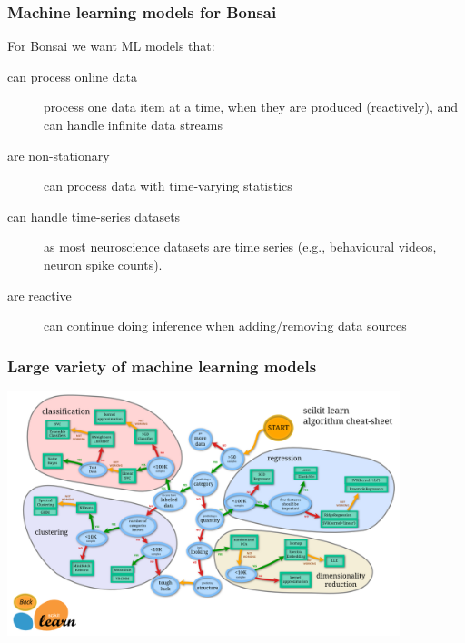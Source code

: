 \begin{frame}
    \frametitle{Machine learning models for Bonsai}

    For Bonsai we want ML models that:

    \begin{description}

        \item[can process online data] process one data item at a time, when they are produced (reactively), and can handle infinite data streams

        \item[are non-stationary] can process data with time-varying statistics

        \item[can handle time-series datasets] as most neuroscience datasets are time series (e.g., behavioural videos, neuron spike counts).

        \item[are reactive] can continue doing inference when adding/removing data sources

    \end{description}

\end{frame}

\begin{frame}
    \frametitle{Large variety of machine learning models}

    \begin{center}
        \includegraphics[width=4.5in]{figures/ml_map.png}
    \end{center}

\end{frame}

